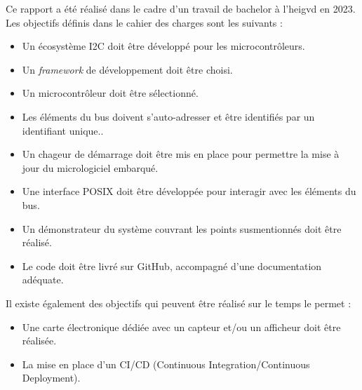 Ce rapport a été réalisé dans le cadre d'un travail de bachelor à l'\gls{heigvd} en 2023.
Les objectifs définis dans le cahier des charges sont les suivants :

\begin{itemize}
    \item Un écosystème I2C doit être développé pour les microcontrôleurs.
    \item Un \textit{\gls{framework}} de développement doit être choisi.
    \item Un microcontrôleur doit être sélectionné.
    \item Les éléments du bus doivent s'auto-adresser et être identifiés par un identifiant unique..
    \item Un chageur de démarrage doit être mis en place pour permettre la mise à jour du micrologiciel embarqué.
    \item Une interface POSIX doit être développée pour interagir avec les éléments du bus.
    \item Un démonstrateur du système couvrant les points susmentionnés doit être réalisé.
    \item Le code doit être livré sur GitHub, accompagné d'une documentation adéquate.
\end{itemize}

Il existe également des objectifs qui peuvent être réalisé sur le temps le permet :

\begin{itemize}
    \item Une carte électronique dédiée avec un capteur et/ou un afficheur doit être réalisée.
    \item La mise en place d'un CI/CD (Continuous Integration/Continuous Deployment).
\end{itemize}

